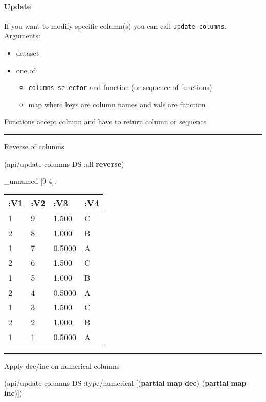 \documentclass[]{article}
\newenvironment{Shaded}{\begin{snugshade}}{\end{snugshade}}
\newcommand{\KeywordTok}[1]{\textcolor[rgb]{0.13,0.29,0.53}{\textbf{#1}}}
\newcommand{\AttributeTok}[1]{\textcolor[rgb]{0.77,0.63,0.00}{#1}}
\newcommand{\NormalTok}[1]{#1}
\providecommand{\tightlist}{%
  \setlength{\itemsep}{0pt}\setlength{\parskip}{0pt}}
\let\oldparagraph\paragraph
\renewcommand{\paragraph}[1]{\oldparagraph{#1}\mbox{}}
\begin{document}
\paragraph{Update}\label{update}

If you want to modify specific column(s) you can call
\texttt{update-columns}. Arguments:

\begin{itemize}
\tightlist
\item
  dataset
\item
  one of:

  \begin{itemize}
  \tightlist
  \item
    \texttt{columns-selector} and function (or sequence of functions)
  \item
    map where keys are column names and vals are function
  \end{itemize}
\end{itemize}

Functions accept column and have to return column or sequence

\begin{center}\rule{0.5\linewidth}{0.5pt}\end{center}

Reverse of columns

\begin{Shaded}
\begin{Highlighting}[]
\NormalTok{(api/update-columns DS }\AttributeTok{:all} \KeywordTok{reverse}\NormalTok{) }
\end{Highlighting}
\end{Shaded}

\_unnamed {[}9 4{]}:

\begin{longtable}[]{@{}llll@{}}
\toprule
:V1 & :V2 & :V3 & :V4\tabularnewline
\midrule
\endhead
1 & 9 & 1.500 & C\tabularnewline
2 & 8 & 1.000 & B\tabularnewline
1 & 7 & 0.5000 & A\tabularnewline
2 & 6 & 1.500 & C\tabularnewline
1 & 5 & 1.000 & B\tabularnewline
2 & 4 & 0.5000 & A\tabularnewline
1 & 3 & 1.500 & C\tabularnewline
2 & 2 & 1.000 & B\tabularnewline
1 & 1 & 0.5000 & A\tabularnewline
\bottomrule
\end{longtable}

\begin{center}\rule{0.5\linewidth}{0.5pt}\end{center}

Apply dec/inc on numerical columns

\begin{Shaded}
\begin{Highlighting}[]
\NormalTok{(api/update-columns DS }\AttributeTok{:type/numerical}\NormalTok{ [(}\KeywordTok{partial} \KeywordTok{map} \KeywordTok{dec}\NormalTok{)}
\NormalTok{                                        (}\KeywordTok{partial} \KeywordTok{map} \KeywordTok{inc}\NormalTok{)])}
\end{Highlighting}
\end{Shaded}
\end{document}
